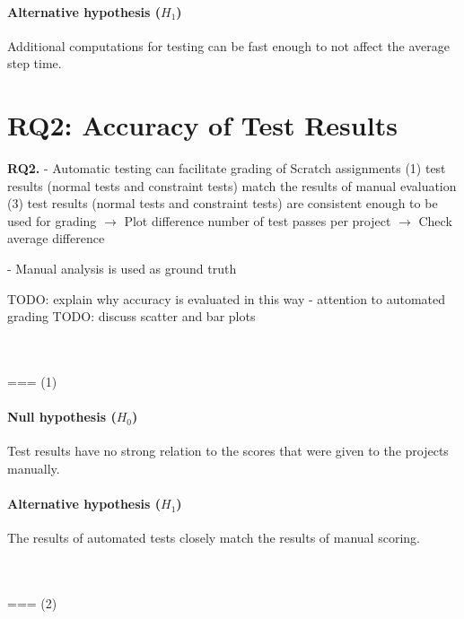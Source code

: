 \paragraph{Alternative hypothesis ($H_1$)}
Additional computations for testing can be fast enough to not affect the average step time.

\section{RQ2: Accuracy of Test Results}

\textbf{RQ2.}
- Automatic testing can facilitate grading of Scratch assignments
    (1) test results (normal tests and constraint tests) match the results of manual evaluation
    (3) test results (normal tests and constraint tests) are consistent enough to be used for grading
        $\rightarrow$ Plot difference number of test passes per project
        $\rightarrow$ Check average difference

- Manual analysis is used as ground truth

TODO: explain why accuracy is evaluated in this way
    - attention to automated grading
TODO: discuss scatter and bar plots

~\\~\\
=== (1)
\paragraph{Null hypothesis ($H_0$)}
Test results have no strong relation to the scores that were given to the projects manually.
\paragraph{Alternative hypothesis ($H_1$)}
The results of automated tests closely match the results of manual scoring.

~\\~\\
=== (2)
